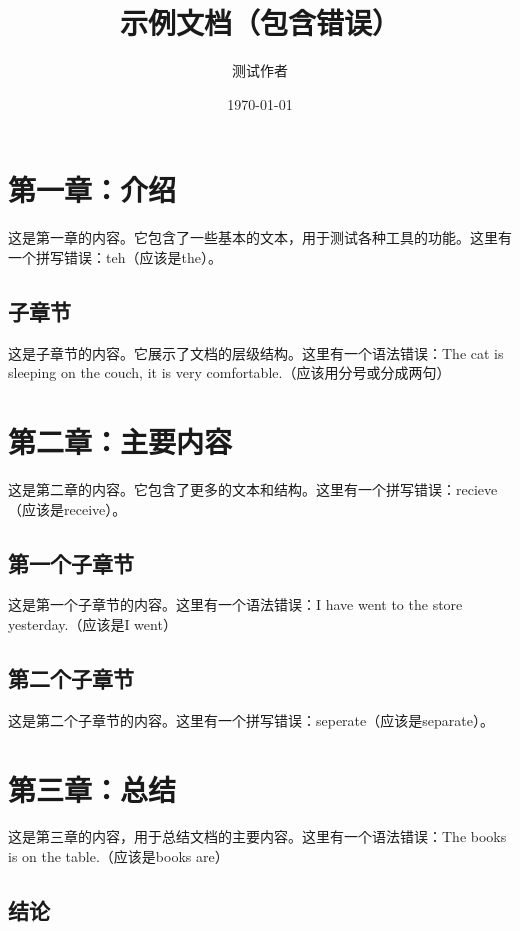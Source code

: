 \documentclass{article}
\title{示例文档（包含错误）}
\author{测试作者}
\date{\today}
\begin{document}
\maketitle

\section{第一章：介绍}

这是第一章的内容。它包含了一些基本的文本，用于测试各种工具的功能。这里有一个拼写错误：teh（应该是the）。

\subsection{子章节}

这是子章节的内容。它展示了文档的层级结构。这里有一个语法错误：The cat is sleeping on the couch, it is very comfortable.（应该用分号或分成两句）

\section{第二章：主要内容}

这是第二章的内容。它包含了更多的文本和结构。这里有一个拼写错误：recieve（应该是receive）。

\subsection{第一个子章节}

这是第一个子章节的内容。这里有一个语法错误：I have went to the store yesterday.（应该是I went）

\subsection{第二个子章节}

这是第二个子章节的内容。这里有一个拼写错误：seperate（应该是separate）。

\section{第三章：总结}

这是第三章的内容，用于总结文档的主要内容。这里有一个语法错误：The books is on the table.（应该是books are）

\subsection{结论}
\end{document}
